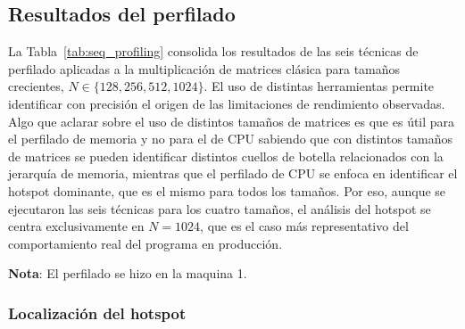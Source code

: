 \subsection{Resultados del perfilado}
\label{sec:Resultados del perfilado}

La Tabla~\ref{tab:seq_profiling} consolida los resultados de las seis técnicas de perfilado aplicadas a la multiplicación de matrices clásica para tamaños crecientes, $N \in \{128, 256, 512, 1024\}$. El uso de distintas herramientas permite identificar con precisión el origen de las limitaciones de rendimiento observadas. Algo que aclarar sobre el uso de distintos tamaños de matrices es que es útil para el perfilado de memoria y no para el de CPU sabiendo que con distintos tamaños de matrices se pueden identificar distintos cuellos de botella relacionados con la jerarquía de memoria, mientras que el perfilado de CPU se enfoca en identificar el hotspot dominante, que es el mismo para todos los tamaños. Por eso, aunque se ejecutaron las seis técnicas para los cuatro tamaños, el análisis del hotspot se centra exclusivamente en $N=1024$, que es el caso más representativo del comportamiento real del programa en producción.

\textbf{Nota}: El perfilado se hizo en la maquina 1.

\begin{table}[H]
\centering
\caption{Caracterización de la implementación secuencial de multiplicación de matrices}
\label{tab:seq_profiling}
\end{table}

\subsubsection{Localización del hotspot}

